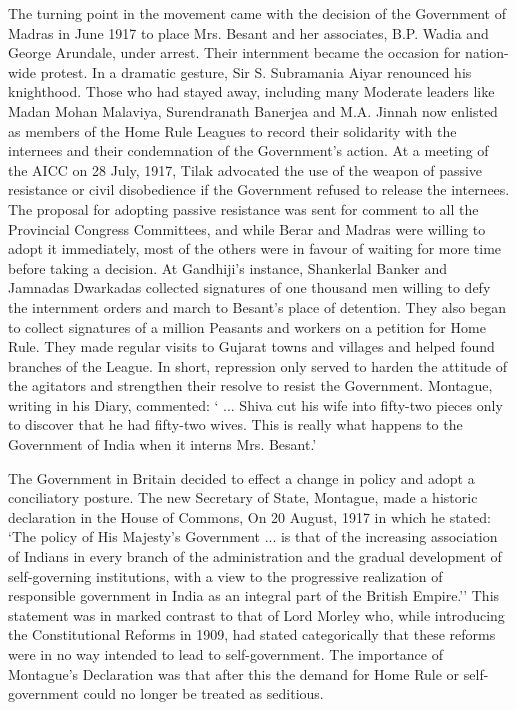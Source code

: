 The turning point in the movement came with the decision of the Government of Madras in June 1917 to place Mrs. Besant and her associates, B.P. Wadia and George Arundale, under arrest. Their internment became the occasion for nation-wide protest. In a dramatic gesture, Sir S. Subramania Aiyar renounced his knighthood. Those who had stayed away, including many Moderate leaders like Madan Mohan Malaviya, Surendranath Banerjea and M.A. Jinnah now enlisted as members of the Home Rule Leagues to record their solidarity with the internees and their condemnation of the Government's action. At a meeting of the AICC on 28 July, 1917, Tilak advocated the use of the weapon of passive resistance or civil disobedience if the Government refused to release the internees. The proposal for adopting passive resistance was sent for comment to all the Provincial Congress Committees, and while Berar and Madras were willing to adopt it immediately, most of the others were in favour of waiting for more time before taking a decision. At Gandhiji's instance, Shankerlal Banker and Jamnadas Dwarkadas collected signatures of one thousand men willing to defy the internment orders and march to Besant's place of detention. They also began to collect signatures of a million Peasants and workers on a petition for Home Rule. They made regular visits to Gujarat towns and villages and helped found branches of the League. In short, repression only served to harden the attitude of the agitators and strengthen their resolve to resist the Government. Montague, writing in his Diary, commented: ` ... Shiva cut his wife into fifty-two pieces only to discover that he had fifty-two wives. This is really what happens to the Government of India when it interns Mrs. Besant.'

The Government in Britain decided to effect a change in policy and adopt a conciliatory posture. The new Secretary of State, Montague, made a historic declaration in the House of Commons, On 20 August, 1917 in which he stated: `The policy of His Majesty's Government ... is that of the increasing association of Indians in every branch of the administration and the gradual development of self-governing institutions, with a view to the progressive realization of responsible government in India as an integral part of the British Empire.'' This statement was in marked contrast to that of Lord Morley who, while introducing the Constitutional Reforms in 1909, had stated categorically that these reforms were in no way intended to lead to self-government. The importance of Montague's Declaration was that after this the demand for Home Rule or self- government could no longer be treated as seditious.

